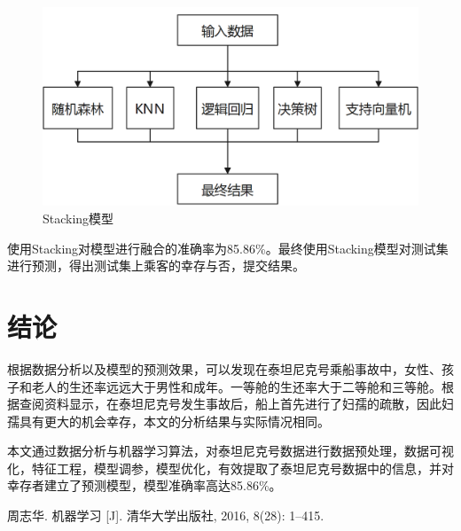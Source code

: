 \begin{figure}[H]
	\centering
	\includegraphics[scale=0.3,angle=0]{images/17.png}
	\caption{Stacking模型}
	\label{17}
\end{figure}
使用Stacking对模型进行融合的准确率为85.86\%。最终使用Stacking模型对测试集进行预测，得出测试集上乘客的幸存与否，提交结果。
\section{结论}
根据数据分析以及模型的预测效果，可以发现在泰坦尼克号乘船事故中，女性、孩子和老人的生还率远远大于男性和成年。一等舱的生还率大于二等舱和三等舱。根据查阅资料显示，在泰坦尼克号发生事故后，船上首先进行了妇孺的疏散，因此妇孺具有更大的机会幸存，本文的分析结果与实际情况相同。

本文通过数据分析与机器学习算法，对泰坦尼克号数据进行数据预处理，数据可视化，特征工程，模型调参，模型优化，有效提取了泰坦尼克号数据中的信息，并对幸存者建立了预测模型，模型准确率高达85.86\%。

\begin{thebibliography}{99}
	周志华. 机器学习 [J]. 清华大学出版社, 2016, 8(28): 1–415.
\end{thebibliography}	


	

